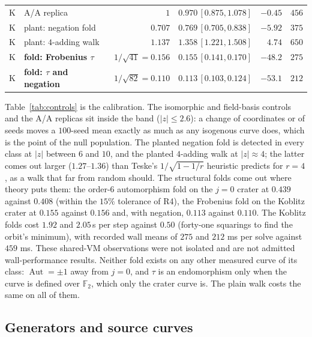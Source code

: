 \documentclass[10pt,a4paper]{article}
\theoremstyle{remark}
\newcommand{\FF}{\mathbb{F}}
\newcommand{\Aut}{\operatorname{Aut}}
\begin{document}
\begin{table}[H]
\begin{tabular}{@{}llrlrr@{}}
K & A/A replica & $1$ & $0.970\,[0.875, 1.078]$ & $-0.45$ & $456$ \\
K & plant: negation fold & $0.707$ & $0.769\,[0.705, 0.838]$ & $-5.92$ & $375$ \\
K & plant: $4$-adding walk & $1.137$ & $1.358\,[1.221, 1.508]$ & $4.74$ & $650$ \\
K & \textbf{fold: Frobenius $\tau$} & $1/\sqrt{41} = 0.156$ & $\mathbf{0.155\,[0.141, 0.170]}$ & $-48.2$ & $275$ \\
K & \textbf{fold: $\tau$ and negation} & $1/\sqrt{82} = 0.110$ & $\mathbf{0.113\,[0.103, 0.124]}$ & $-53.1$ & $212$ \\
\bottomrule
\end{tabular}
\end{table}

Table~\ref{tab:controls} is the calibration. The isomorphic and field-basis
controls and the A/A replicas sit inside the band ($|z| \le 2.6$): a change of
coordinates or of seeds moves a $100$-seed mean exactly as much as any
isogenous curve does, which is the point of the null population. The
planted negation fold is detected in every class at $|z|$ between $6$ and
$10$, and the planted $4$-adding walk at $|z| \approx 4$; the latter comes out
larger ($1.27$--$1.36$) than Teske's $1/\sqrt{1 - 1/r}$ heuristic predicts for
$r = 4$, as a walk that far from random should. The structural folds come
out where theory puts them: the order-$6$ automorphism fold on the $j = 0$
crater at $0.439$ against $0.408$ (within the $15\%$ tolerance of R4), the
Frobenius fold on the Koblitz crater at $0.155$ against $0.156$ and, with
negation, $0.113$ against $0.110$. The Koblitz folds cost $1.92$ and
$2.05$\,\textmu s per step against $0.50$ (forty-one squarings to find the
orbit's minimum), with recorded wall means of $275$ and $212$ ms per solve
against $459$ ms. These shared-VM observations were not isolated and are not
admitted wall-performance results. Neither fold exists on any other measured
curve of its class:
$\Aut = \pm 1$ away from $j = 0$, and $\tau$ is an endomorphism only when the
curve is defined over $\FF_2$, which only the crater curve is. The plain walk
costs the same on all of them.

\subsection{Generators and source curves}
\end{document}
